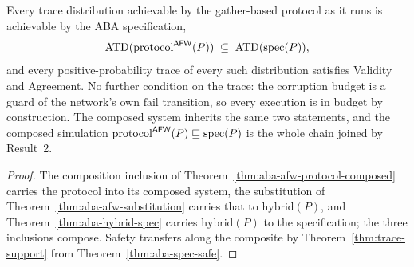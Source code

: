 \begin{theorem}
  \label{thm:aba-afw-main}
  \leanok
  Every trace distribution achievable by the gather-based protocol as it runs is achievable by the ABA specification,
  \[
    \operatorname{ATD}(\mathrm{protocol}^{\mathsf{AFW}}(P)) \;\subseteq\; \operatorname{ATD}(\mathrm{spec}(P)),
  \]
  and every positive-probability trace of every such distribution satisfies Validity and Agreement.
  No further condition on the trace: the corruption budget is a guard of the network's own $\mathrm{fail}$ transition, so every execution is in budget by construction.
  The composed system inherits the same two statements, and the composed simulation $\mathrm{protocol}^{\mathsf{AFW}}(P) \sqsubseteq \mathrm{spec}(P)$ is the whole chain joined by Result~2.
\end{theorem}

\begin{proof}\leanok
  The composition inclusion of Theorem~\ref{thm:aba-afw-protocol-composed} carries the protocol into its composed system, the substitution of Theorem~\ref{thm:aba-afw-substitution} carries that to $\mathrm{hybrid}(P)$, and Theorem~\ref{thm:aba-hybrid-spec} carries $\mathrm{hybrid}(P)$ to the specification; the three inclusions compose.
  Safety transfers along the composite by Theorem~\ref{thm:trace-support} from Theorem~\ref{thm:aba-spec-safe}.
\end{proof}

